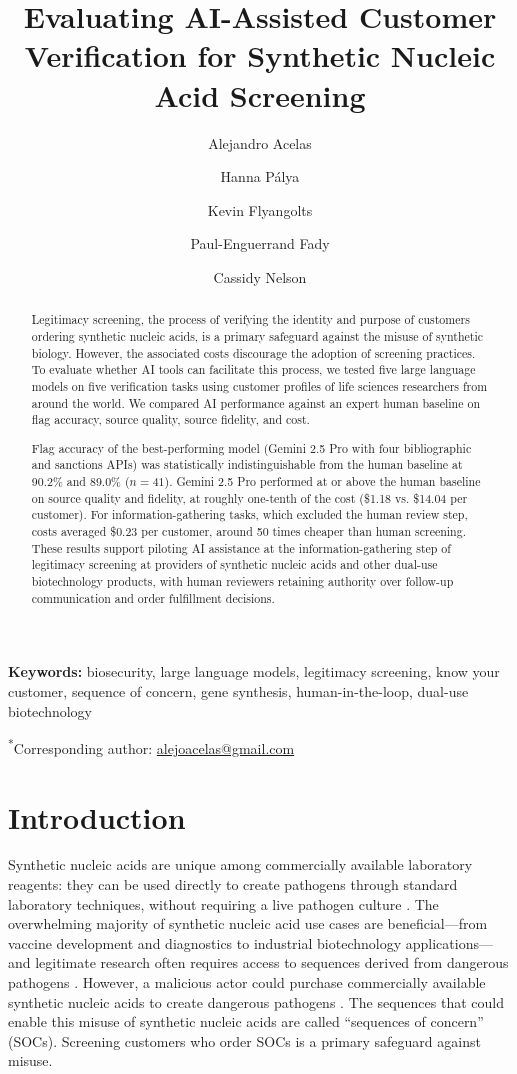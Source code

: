 \documentclass[12pt]{article}
\title{Evaluating AI-Assisted Customer Verification for Synthetic Nucleic Acid Screening}
\author[1,*]{Alejandro Acelas}
\author[1,2]{Hanna P\'{a}lya}
\author[3]{Kevin Flyangolts}
\author[1]{Paul-Enguerrand Fady}
\author[1]{Cassidy Nelson}
\affil[1]{The Centre for Long-Term Resilience, London, United Kingdom}
\affil[2]{University of Warwick, Coventry, United Kingdom}
\affil[3]{Aclid, New York, United States}
\date{}
\begin{document}
\maketitle

\begin{abstract}
Legitimacy screening, the process of verifying the identity and purpose of customers ordering synthetic nucleic acids, is a primary safeguard against the misuse of synthetic biology. However, the associated costs discourage the adoption of screening practices. To evaluate whether AI tools can facilitate this process, we tested five large language models on five verification tasks using customer profiles of life sciences researchers from around the world. We compared AI performance against an expert human baseline on flag accuracy, source quality, source fidelity, and cost.

Flag accuracy of the best-performing model (Gemini 2.5 Pro with four bibliographic and sanctions APIs) was statistically indistinguishable from the human baseline at 90.2\% and 89.0\% ($n = 41$). Gemini 2.5 Pro performed at or above the human baseline on source quality and fidelity, at roughly one-tenth of the cost (\$1.18 vs. \$14.04 per customer). For information-gathering tasks, which excluded the human review step, costs averaged \$0.23 per customer, around 50 times cheaper than human screening. These results support piloting AI assistance at the information-gathering step of legitimacy screening at providers of synthetic nucleic acids and other dual-use biotechnology products, with human reviewers retaining authority over follow-up communication and order fulfillment decisions.
\end{abstract}

\noindent\textbf{Keywords:} biosecurity, large language models, legitimacy screening, know your customer, sequence of concern, gene synthesis, human-in-the-loop, dual-use biotechnology

\vspace{1em}
\noindent\textsuperscript{*}Corresponding author: \href{mailto:alejoacelas@gmail.com}{alejoacelas@gmail.com}

\newpage

\section{Introduction}

Synthetic nucleic acids are unique among commercially available laboratory reagents: they can be used directly to create pathogens through standard laboratory techniques, without requiring a live pathogen culture \citep{Cello2002}. The overwhelming majority of synthetic nucleic acid use cases are beneficial—from vaccine development and diagnostics to industrial biotechnology applications—and legitimate research often requires access to sequences derived from dangerous pathogens \citep{Tan2021}. However, a malicious actor could purchase commercially available synthetic nucleic acids to create dangerous pathogens \citep{Haddad2025}. The sequences that could enable this misuse of synthetic nucleic acids are called ``sequences of concern'' (SOCs). Screening customers who order SOCs is a primary safeguard against misuse.
\end{document}
